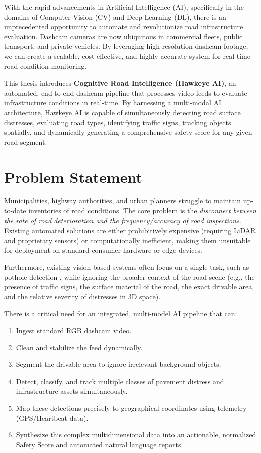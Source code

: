 With the rapid advancements in Artificial Intelligence (AI), specifically in the domains of Computer Vision (CV) and Deep Learning (DL), there is an unprecedented opportunity to automate and revolutionize road infrastructure evaluation. Dashcam cameras are now ubiquitous in commercial fleets, public transport, and private vehicles. By leveraging high-resolution dashcam footage, we can create a scalable, cost-effective, and highly accurate system for real-time road condition monitoring.

This thesis introduces \textbf{Cognitive Road Intelligence (Hawkeye AI)}, an automated, end-to-end dashcam pipeline that processes video feeds to evaluate infrastructure conditions in real-time. By harnessing a multi-modal AI architecture, Hawkeye AI is capable of simultaneously detecting road surface distresses, evaluating road types, identifying traffic signs, tracking objects spatially, and dynamically generating a comprehensive safety score for any given road segment. 

\section{Problem Statement}
Municipalities, highway authorities, and urban planners struggle to maintain up-to-date inventories of road conditions. The core problem is the \textit{disconnect between the rate of road deterioration and the frequency/accuracy of road inspections}. Existing automated solutions are either prohibitively expensive (requiring LiDAR and proprietary sensors) or computationally inefficient, making them unsuitable for deployment on standard consumer hardware or edge devices. 

Furthermore, existing vision-based systems often focus on a single task, such as pothole detection \cite{rdd2022}, while ignoring the broader context of the road scene (e.g., the presence of traffic signs, the surface material of the road, the exact drivable area, and the relative severity of distresses in 3D space). 

There is a critical need for an integrated, multi-model AI pipeline that can:
\begin{enumerate}
    \item Ingest standard RGB dashcam video.
    \item Clean and stabilize the feed dynamically.
    \item Segment the drivable area to ignore irrelevant background objects.
    \item Detect, classify, and track multiple classes of pavement distress and infrastructure assets simultaneously.
    \item Map these detections precisely to geographical coordinates using telemetry (GPS/Heartbeat data).
    \item Synthesize this complex multidimensional data into an actionable, normalized Safety Score and automated natural language reports.
\end{enumerate}

